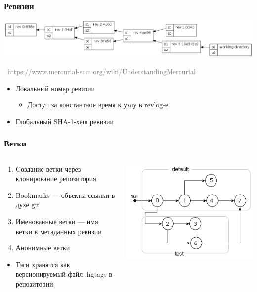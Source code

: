 \documentclass[xetex,mathserif,serif]{beamer}
\newcommand{\attribution}[1] {
	\vspace{-5mm}\begin{flushright}\begin{scriptsize}\textcolor{gray}{\textcopyright\, #1}\end{scriptsize}\end{flushright}
}
\begin{document}
	\begin{frame}
		\frametitle{Ревизии}
		\begin{center}
			\includegraphics[width=\textwidth]{mercurialRevisions.png}
			\attribution{https://www.mercurial-scm.org/wiki/UnderstandingMercurial}
		\end{center}
		\begin{itemize}
			\item Локальный номер ревизии
			\begin{itemize}
				\item Доступ за константное время к узлу в revlog-е
			\end{itemize}
			\item Глобальный SHA-1-хеш ревизии
		\end{itemize}
	\end{frame}

	\begin{frame}
		\frametitle{Ветки}
		\begin{columns}
			\begin{column}{0.6\textwidth}
				\begin{enumerate}
					\item Cоздание ветки через клонирование репозитория
					\item Bookmarks --- объекты-ссылки в духе git
					\item Именованные ветки --- имя ветки в метаданных ревизии
					\item Анонимные ветки
				\end{enumerate}
				\begin{itemize}
					\item Тэги хранятся как версионируемый файл .hgtags в репозитории
				\end{itemize}
			\end{column}
			\begin{column}{0.4\textwidth}
				\includegraphics[width=\textwidth]{mercurialBranches.png}
			\end{column}
		\end{columns}
	\end{frame}
\end{document}
